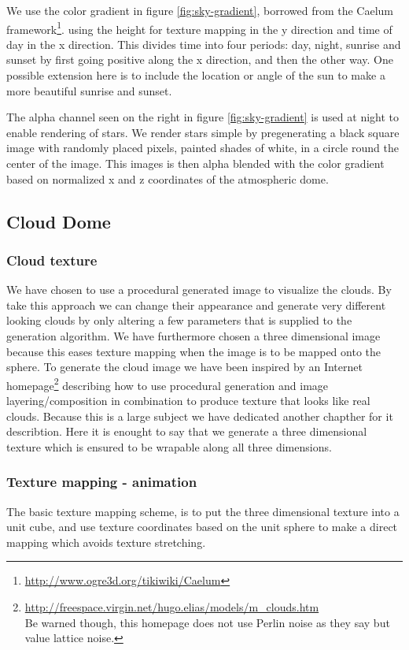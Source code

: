 We use the color gradient in figure
\ref{fig:sky-gradient}, borrowed from the Caelum
framework\footnote{\url{http://www.ogre3d.org/tikiwiki/Caelum}}.
using the height for texture mapping in the y direction and time of
day in the x direction. This divides time into four periods: day,
night, sunrise and sunset by first going positive along the x direction,
and then the other way.
One possible extension here is to include the location or angle of the
sun to make a more beautiful sunrise and sunset.

The alpha channel seen on the right in figure \ref{fig:sky-gradient}
is used at night to enable rendering of stars. We render stars simple
by pregenerating a black square image with randomly placed pixels,
painted shades of white, in a circle round the center of the
image. This images is then alpha blended with the color gradient based
on normalized x and z coordinates of the atmospheric dome.

\subsection{Cloud Dome}

\subsubsection{Cloud texture}
We have chosen to use a procedural generated image to visualize the
clouds. By take this approach we can change their appearance and
generate very different looking clouds by only altering a few
parameters that is supplied to the generation algorithm.
%
We have furthermore chosen a three dimensional image because this
eases texture mapping when the image is to be mapped onto the sphere.
%
To generate the cloud image we have been inspired by an Internet
homepage\footnote{\url{http://freespace.virgin.net/hugo.elias/models/m_clouds.htm}
  \\Be warned though, this homepage does not use Perlin noise as they
  say but value lattice noise.}
describing how to use procedural generation and
image layering/composition in combination to produce texture that
looks like real clouds.
Because this is a large subject we have dedicated another chapther for
it describtion. Here it is enought to say that we generate a three
dimensional texture which is ensured to be wrapable along all three
dimensions.

\subsubsection{Texture mapping - animation}
The basic texture mapping scheme, is to put the three dimensional
texture into a unit cube, and use texture coordinates based on the
unit sphere to make a direct mapping which avoids texture stretching.

